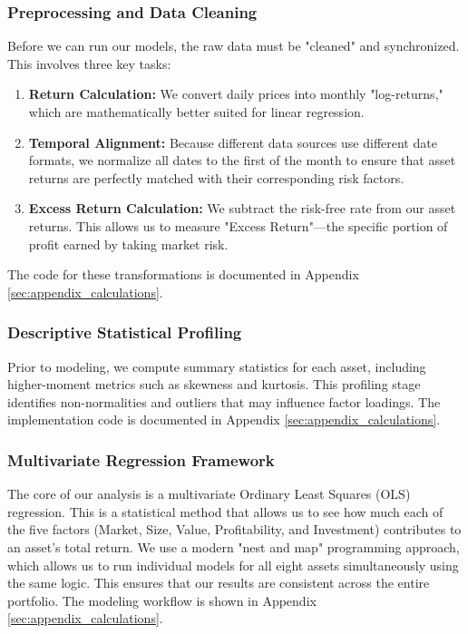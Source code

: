 \documentclass[12pt]{article}
\begin{document}
\subsubsection{Preprocessing and Data Cleaning}
Before we can run our models, the raw data must be "cleaned" and synchronized. This involves three key tasks: 
\begin{enumerate}
    \item \textbf{Return Calculation:} We convert daily prices into monthly "log-returns," which are mathematically better suited for linear regression.
    \item \textbf{Temporal Alignment:} Because different data sources use different date formats, we normalize all dates to the first of the month to ensure that asset returns are perfectly matched with their corresponding risk factors.
    \item \textbf{Excess Return Calculation:} We subtract the risk-free rate from our asset returns. This allows us to measure "Excess Return"---the specific portion of profit earned by taking market risk.
\end{enumerate}
The code for these transformations is documented in Appendix \ref{sec:appendix_calculations}.

\subsubsection{Descriptive Statistical Profiling}
Prior to modeling, we compute summary statistics for each asset, including higher-moment metrics such as skewness and kurtosis. This profiling stage identifies non-normalities and outliers that may influence factor loadings. The implementation code is documented in Appendix \ref{sec:appendix_calculations}.

\subsubsection{Multivariate Regression Framework}
The core of our analysis is a multivariate Ordinary Least Squares (OLS) regression. This is a statistical method that allows us to see how much each of the five factors (Market, Size, Value, Profitability, and Investment) contributes to an asset's total return. We use a modern "nest and map" programming approach, which allows us to run individual models for all eight assets simultaneously using the same logic. This ensures that our results are consistent across the entire portfolio. The modeling workflow is shown in Appendix \ref{sec:appendix_calculations}.
\end{document}
